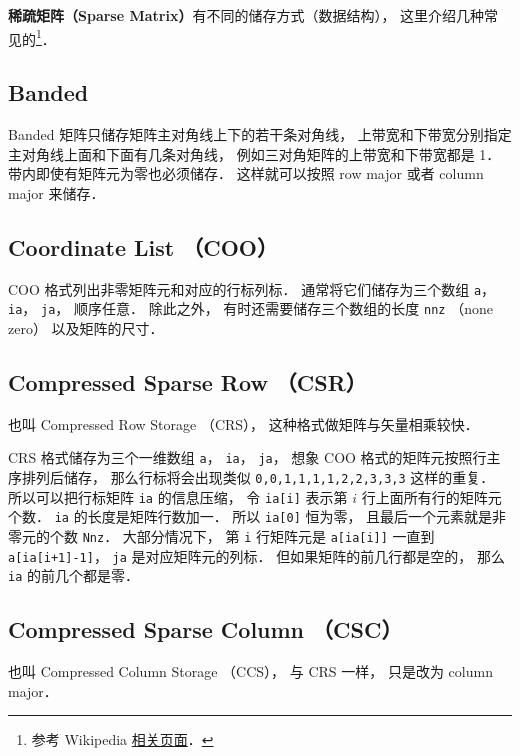 
\textbf{稀疏矩阵（Sparse Matrix）}有不同的储存方式（数据结构）， 这里介绍几种常见的\footnote{参考 Wikipedia \href{https://en.wikipedia.org/wiki/Sparse_matrix}{相关页面}．}．

\subsection{Banded}
Banded 矩阵只储存矩阵主对角线上下的若干条对角线， 上带宽和下带宽分别指定主对角线上面和下面有几条对角线， 例如三对角矩阵的上带宽和下带宽都是 1． 带内即使有矩阵元为零也必须储存． 这样就可以按照 row major 或者 column major 来储存．

\subsection{Coordinate List （COO）}
COO 格式列出非零矩阵元和对应的行标列标． 通常将它们储存为三个数组 \verb|a|， \verb|ia|， \verb|ja|， 顺序任意． 除此之外， 有时还需要储存三个数组的长度 \verb|nnz| （none zero） 以及矩阵的尺寸．

\subsection{Compressed Sparse Row （CSR）}
也叫 Compressed Row Storage （CRS）， 这种格式做矩阵与矢量相乘较快．

CRS 格式储存为三个一维数组 \verb|a|， \verb|ia|， \verb|ja|， 想象 COO 格式的矩阵元按照行主序排列后储存， 那么行标将会出现类似 \verb|0,0,1,1,1,1,2,2,3,3,3| 这样的重复． 所以可以把行标矩阵 \verb|ia| 的信息压缩， 令 \verb|ia[i]| 表示第 $i$ 行上面所有行的矩阵元个数． \verb|ia| 的长度是矩阵行数加一． 所以 \verb|ia[0]| 恒为零， 且最后一个元素就是非零元的个数 \verb|Nnz|． 大部分情况下， 第 \verb|i| 行矩阵元是 \verb|a[ia[i]]| 一直到 \verb|a[ia[i+1]-1]|， \verb|ja| 是对应矩阵元的列标． 但如果矩阵的前几行都是空的， 那么 \verb|ia| 的前几个都是零．

\subsection{Compressed Sparse Column （CSC）}
也叫 Compressed Column Storage （CCS）， 与 CRS 一样， 只是改为 column major．
